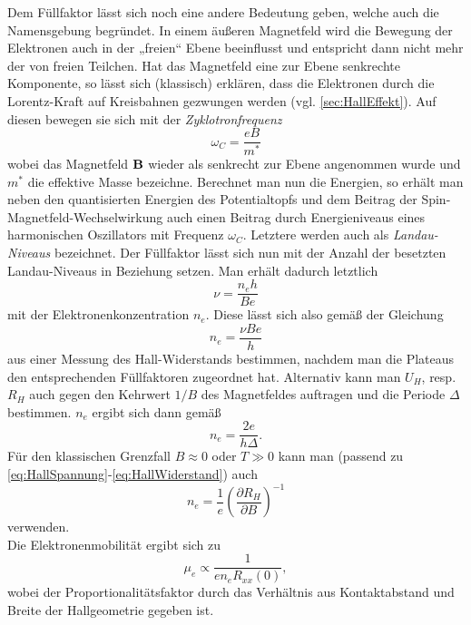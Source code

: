 Dem Füllfaktor lässt sich noch eine andere Bedeutung geben, welche auch die Namensgebung begründet.
In einem äußeren Magnetfeld wird die Bewegung der Elektronen auch in der „freien“ Ebene beeinflusst und entspricht dann nicht mehr der von freien Teilchen. Hat das Magnetfeld eine zur Ebene senkrechte Komponente, so lässt sich (klassisch) erklären, dass die Elektronen durch die Lorentz-Kraft auf Kreisbahnen gezwungen werden (vgl. \autoref{sec:HallEffekt}). Auf diesen bewegen sie sich mit der \emph{Zyklotronfrequenz}
$$\omega_C = \frac{eB}{m^*}$$
wobei das Magnetfeld $\textbf{B}$ wieder als senkrecht zur Ebene angenommen wurde und $m^*$ die effektive Masse bezeichne. Berechnet man nun die Energien, so erhält man neben den quantisierten Energien des Potentialtopfs und dem Beitrag der Spin-Magnetfeld-Wechselwirkung auch einen Beitrag durch Energieniveaus eines harmonischen Oszillators mit Frequenz $\omega_C$. Letztere werden auch als \emph{Landau-Niveaus} bezeichnet. Der Füllfaktor
lässt sich nun mit der Anzahl der besetzten Landau-Niveaus in Beziehung setzen. Man erhält dadurch letztlich
\begin{equation}\label{eq:Fuellfaktor}
\nu = \frac{n_eh}{Be}
\end{equation}
mit der Elektronenkonzentration $n_e$. Diese lässt sich also gemäß der Gleichung
\begin{equation}\label{eq:ElektrKonz1}
n_e = \frac{\nu Be}{h}
\end{equation}
aus einer Messung des Hall-Widerstands bestimmen, nachdem man die Plateaus den entsprechenden Füllfaktoren zugeordnet hat.
Alternativ kann man $U_H$, resp. $R_H$ auch gegen den Kehrwert $1/B$ des Magnetfeldes auftragen und die Periode
$\Delta$ bestimmen. $n_e$ ergibt sich dann gemäß
\begin{equation}\label{eq:ElektrKonz2}
n_e = \frac{2e}{h\Delta}.
\end{equation}
Für den klassischen Grenzfall $B\approx 0$ oder $T\gg0$ kann man (passend zu \eqref{eq:HallSpannung}-\eqref{eq:HallWiderstand}) auch
\begin{equation}\label{eq:ElektrKonz3}
n_e = \frac{1}{e}\left(\frac{\partial R_H}{\partial B}\right)^{-1}
\end{equation}
verwenden.\\
Die Elektronenmobilität ergibt sich zu
\begin{equation}\label{eq:Mobilitaet}
\mu_e \propto \frac{1}{e n_eR_{xx}(0)},
\end{equation}
wobei der Proportionalitätsfaktor durch das Verhältnis aus Kontaktabstand und Breite der Hallgeometrie gegeben ist.
\nocite{qhe}
\nocite{wiki-fg}
\nocite{wiki-he}
